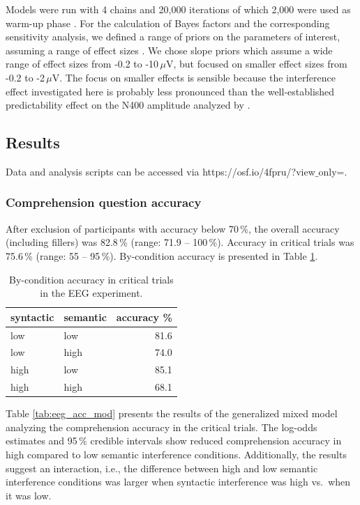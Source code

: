 \documentclass[a4paper, man, floatsintext]{apa7}
\begin{document}
Models were run with 4 chains and 20,000 iterations of which 2,000 were used as warm-up phase \citep{schad_etal_2022_BF}. For the calculation of Bayes factors and the corresponding sensitivity analysis, we defined a range of priors on the parameters of interest, assuming a range of effect sizes \citep{nicenboim_stats}. We chose slope priors which assume a wide range of effect sizes from -0.2 to -10\,$\mu$V, but focused on smaller effect sizes from -0.2 to -2\,$\mu$V. The focus on smaller effects is sensible because the interference effect investigated here is probably less pronounced than the well-established predictability effect on the N400 amplitude analyzed by \citet{nicenboim_stats}.


\subsection{Results}
Data and analysis scripts can be accessed via https://osf.io/4fpru/?view$\_$only=.

\subsubsection{Comprehension question accuracy}
After exclusion of participants with accuracy below 70\,\%, the overall accuracy (including fillers) was 82.8\,\% (range: 71.9 -- 100\,\%). Accuracy in critical trials was 75.6\,\% (range: 55 -- 95\,\%). By-condition accuracy is presented in Table \ref{tab:eeg_acc}. 

\begin{table}[]
    \caption{By-condition accuracy in critical trials in the EEG experiment.}
    \label{tab:eeg_acc}
    \centering
    \begin{tabular}{llr}
    \toprule
    syntactic & semantic & accuracy \%\\
    \midrule
        low &  low & 81.6\\
        low &  high & 74.0\\
        high &  low & 85.1\\
        high &  high & 68.1\\
    \bottomrule
    \end{tabular}
\end{table}

Table \ref{tab:eeg_acc_mod} presents the results of the generalized mixed model analyzing the comprehension accuracy in the critical trials. The log-odds estimates and 95\,\% credible intervals show reduced comprehension accuracy in high compared to low semantic interference conditions. Additionally, the results suggest an interaction, i.e., the difference between high and low semantic interference conditions was larger when syntactic interference was high vs.\ when it was low.
\end{document}
